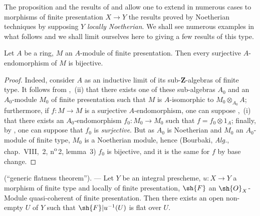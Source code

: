 \begin{env}[8.9.2]
\label{IV.8.9.2}
The proposition  and the results of  and  allow one to extend in numerous cases to morphisms of finite presentation $X\to Y$ the results proved by Noetherian techniques by supposing $Y$ \emph{locally Noetherian}.
We shall see numerous examples in what follows and we shall limit ourselves here to giving a few results of this type.
\end{env}

\begin{proposition}[8.9.3]
\label{IV.8.9.3}
Let $A$ be a ring, $M$ an $A$-module of finite presentation.
Then every surjective $A$-endomorphism of $M$ is bijective.
\end{proposition}

\begin{proof}
Indeed, consider $A$ as an inductive limit of its sub-$\mathbf{Z}$-algebras of finite type.
It follows from ,~(ii) that there exists one of these sub-algebras $A_0$ and an $A_0$-module $M_0$ of finite presentation such that $M$ is $A$-isomorphic to $M_0\otimes_{A_0}A$; furthermore, if $f:M\to M$ is a surjective $A$-endomorphism, one can suppose ,~(i) that there exists an $A_0$-endomorphism $f_0:M_0\to M_0$ such that $f=f_0\otimes 1_A$; finally, by , one can suppose that $f_0$ is \emph{surjective}.
But as $A_0$ is Noetherian and $M_0$ an $A_0$-module of finite type, $M_0$ is a Noetherian module, hence (Bourbaki, \emph{Alg.}, chap.~VIII, \textsection\,2, n\textsuperscript{o}\,2, lemma~3) $f_0$ is bijective, and it is the same for $f$ by base change.
\end{proof}

\begin{proposition}[8.9.4]
\label{IV.8.9.4}
(``generic flatness theorem''). --- Let $Y$ be an integral prescheme, $u:X\to Y$ a morphism of finite type and locally of finite presentation, $\sh{F}$ an $\sh{O}_X$-Module quasi-coherent of finite presentation.
Then there exists an open non-empty $U$ of $Y$ such that $\sh{F}|u^{-1}(U)$ is flat over $U$.
\end{proposition}

